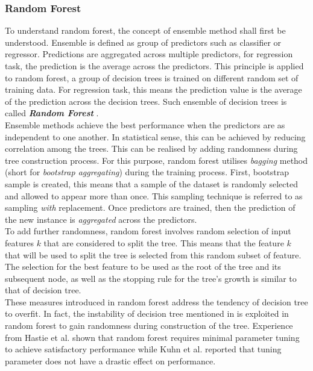 \subsubsection{Random Forest}\label{rf_theo}

To understand random forest, the concept of ensemble method shall first be understood. Ensemble is defined as group of predictors such as classifier or regressor. Predictions are aggregated across multiple predictors, for regression task, the prediction is the average across the predictors. This principle is applied to random forest, a group of decision trees is trained on different random set of training data. For regression task, this means the prediction value is the average of the prediction across the decision trees. Such ensemble of decision trees is called \emph{\textbf{Random Forest}} \cite{Hastie.2009,Breiman.2001,TinKamHo.1995}.\\

Ensemble methods achieve the best performance when the predictors are as independent to one another. In statistical sense, this can be achieved by reducing correlation among the trees. This can be realised by adding randomness during tree construction process. For this purpose, random forest utilises \emph{bagging} \cite{Breiman.1996} method (short for \emph{bootstrap aggregating}) during the training process. First, bootstrap sample is created, this means that a sample of the dataset is randomly selected and allowed to appear more than once. This sampling technique is referred to as sampling \emph{with} replacement. Once predictors are trained, then the prediction of the new instance is \emph{aggregated} across the predictors. \cite{Kuhn.2013,Hastie.2009,Geron.2019}\\

To add further randomness, random forest involves random selection of input features $k$ that are considered to split the tree. This means that the feature $k$ that will be used to split the tree is selected from this random subset of feature. The selection for the best feature to be used as the root of the tree and its subsequent node, as well as the stopping rule for the tree's growth is similar to that of decision tree. \cite{Kuhn.2013,Hastie.2009,Geron.2019}\\

These measures introduced in random forest address the tendency of decision tree to overfit. In fact, the instability of decision tree mentioned in  is exploited in random forest to gain randomness during construction of the tree. Experience from Hastie et al. \cite{Hastie.2009} shown that random forest requires minimal parameter tuning to achieve satisfactory performance while Kuhn et al. \cite{Kuhn.2013} reported that tuning parameter does not have a drastic effect on performance. \\

